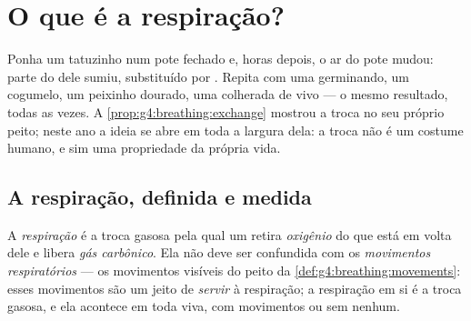 \chapter{O que é a respiração?}\label{ch:g7:what-is-respiration}

Ponha um tatuzinho num pote fechado e, horas depois, o ar do pote
mudou: parte do  dele sumiu, substituído por .
Repita com uma  germinando, um cogumelo, um peixinho dourado,
uma colherada de  vivo --- o mesmo resultado, todas as vezes. A
\cref{prop:g4:breathing:exchange} mostrou a troca no seu próprio
peito; neste ano a ideia se abre em toda a largura dela: a troca não é
um costume humano, e sim uma propriedade da própria vida.

\section{A respiração, definida e medida}

\begin{definition}[Respiração]\label{def:g7:what-is-respiration:respiration}
A \emph{respiração} é a troca gasosa pela qual um  retira \emph{oxigênio} do que está em volta dele
e libera \emph{gás carbônico}. Ela não deve ser
confundida com os \emph{movimentos respiratórios}
--- os movimentos visíveis do peito da
\cref{def:g4:breathing:movements}: esses movimentos são um jeito de
\emph{servir} à respiração; a respiração em si é a troca gasosa, e ela
acontece em toda  viva, com movimentos ou sem nenhum.
\end{definition}

